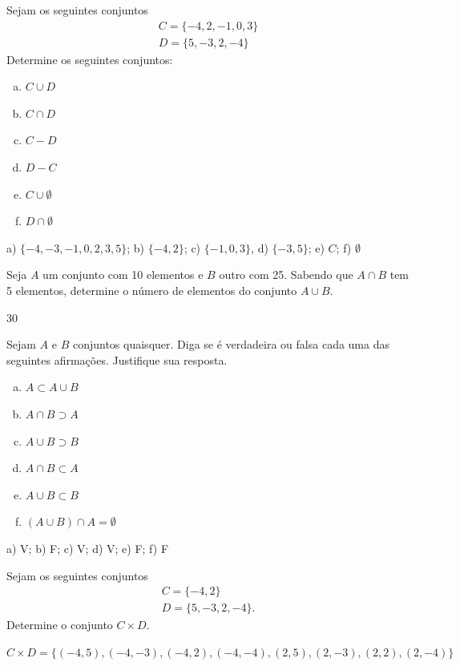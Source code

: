 \begin{exer}
  Sejam os seguintes conjuntos
  \begin{gather}
    C = \{-4,2,-1,0,3\}\\
    D = \{5,-3,2,-4\}
  \end{gather}
  Determine os seguintes conjuntos:
  \begin{enumerate}[a)]
  \item $C\cup D$
  \item $C\cap D$
  \item $C - D$
  \item $D - C$
  \item $C\cup \emptyset$
  \item $D\cap \emptyset$
  \end{enumerate}
\end{exer}
\begin{resp}
  a) $\{-4,-3,-1,0,2,3,5\}$; b) $\{-4,2\}$; c) $\{-1,0,3\}$, d) $\{-3,5\}$; e) $C$; f) $\emptyset$
\end{resp}

\begin{exer}
  Seja $A$ um conjunto com 10 elementos e $B$ outro com 25. Sabendo que $A\cap B$ tem 5 elementos, determine o número de elementos do conjunto $A\cup B$. 
\end{exer}
\begin{resp}
  30
\end{resp}

\begin{exer}
  Sejam $A$ e $B$ conjuntos quaisquer. Diga se é verdadeira ou falsa cada uma das seguintes afirmações. Justifique sua resposta.
  \begin{enumerate}[a)]
  \item $A \subset A\cup B$
  \item $A\cap B \supset A$
  \item $A\cup B \supset B$
  \item $A\cap B \subset A$
  \item $A\cup B \subset B$
  \item $(A\cup B)\cap A = \emptyset$
  \end{enumerate}
\end{exer}
\begin{resp}
  a) V; b) F; c) V; d) V; e) F; f) F
\end{resp}

\begin{exer}
  Sejam os seguintes conjuntos
  \begin{gather}
    C = \{-4,2\}\\
    D = \{5,-3,2,-4\}.
  \end{gather}
  Determine o conjunto $C\times D$.
\end{exer}
\begin{resp}
  $C\times D = \{(-4,5),(-4,-3),(-4,2),(-4,-4),(2,5),(2,-3),(2,2),(2,-4)\}$
\end{resp}

